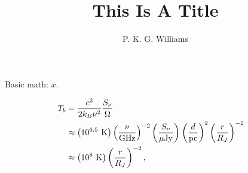 \documentclass{article}
\title{This Is A Title}
\author{P. K. G. Williams}
\newcommand\ujy{\ensuremath{\mu\text{Jy}}}
\newcommand\fpow[3]{\left(\frac{#1}{#2}\right)^{#3}}
\begin{document}
Basic math: $x$.

\WEBTEXtraceon \begin{align}
T_b &= \frac{c^2}{2 k_B \nu^2} \frac{S_\nu}{\Omega} \cr
 &\approx \left(10^{6.5}\text{ K}\right) \fpow{\nu}{\text{GHz}}{-2}
   \fpow{S_\nu}{\ujy}{} \fpow{d}{\text{pc}}{2} \fpow{r}{R_J}{-2} \cr
 &\approx \left(10^8\text{ K}\right) \fpow{r}{R_J}{-2},
\end{align}
\end{document}
